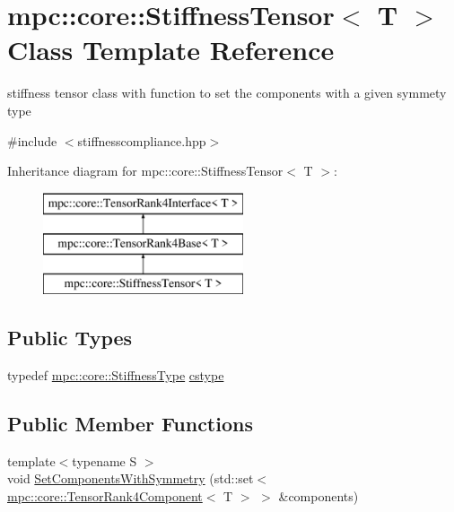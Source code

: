 \hypertarget{structmpc_1_1core_1_1_stiffness_tensor}{}\section{mpc\+:\+:core\+:\+:Stiffness\+Tensor$<$ T $>$ Class Template Reference}
\label{structmpc_1_1core_1_1_stiffness_tensor}


stiffness tensor class with function to set the components with a given symmety type  




{\ttfamily \#include $<$stiffnesscompliance.\+hpp$>$}

Inheritance diagram for mpc\+:\+:core\+:\+:Stiffness\+Tensor$<$ T $>$\+:\begin{figure}[H]
\begin{center}
\leavevmode
\includegraphics[height=3.000000cm]{structmpc_1_1core_1_1_stiffness_tensor}
\end{center}
\end{figure}
\subsection*{Public Types}
\begin{DoxyCompactItemize}
\item 
typedef \mbox{\hyperlink{structmpc_1_1core_1_1_stiffness_type}{mpc\+::core\+::\+Stiffness\+Type}} \mbox{\hyperlink{structmpc_1_1core_1_1_stiffness_tensor_ad8129e50fb9d974c0ba792d8b17b203a}{cstype}}
\end{DoxyCompactItemize}
\subsection*{Public Member Functions}
\begin{DoxyCompactItemize}
\item 
{\footnotesize template$<$typename S $>$ }\\void \mbox{\hyperlink{structmpc_1_1core_1_1_stiffness_tensor_af86bb5adbcc6bb3df1ed6bfabb8fde91}{Set\+Components\+With\+Symmetry}} (std\+::set$<$ \mbox{\hyperlink{namespacempc_1_1core_ac3a232afc7c680d580628e834030482f}{mpc\+::core\+::\+Tensor\+Rank4\+Component}}$<$ T $>$ $>$ \&components)
\end{DoxyCompactItemize}
